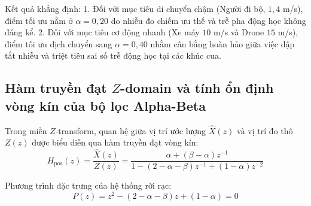 \begin{table}[H]
\centering
\caption{Độ nhạy sai số RMSE theo tham số $\alpha$ trên ba loại mục tiêu ($n=10$ seed, cự ly 400 m)}
\label{tab:multi-target-alpha-sensitivity}
\end{table}

Kết quả khẳng định:
1. Đối với mục tiêu di chuyển chậm (Người đi bộ, $1{,}4$ m/s), điểm tối ưu nằm ở $\alpha = 0{,}20$ do nhiễu đo chiếm ưu thế và trễ pha động học không đáng kể.
2. Đối với mục tiêu cơ động nhanh (Xe máy $10$ m/s và Drone $15$ m/s), điểm tối ưu dịch chuyển sang $\alpha = 0{,}40$ nhằm cân bằng hoàn hảo giữa việc dập tắt nhiễu và triệt tiêu sai số trễ động học tại các khúc cua.

\subsection{Hàm truyền đạt \texorpdfstring{$Z$}{Z}-domain và tính ổn định vòng kín của bộ lọc Alpha-Beta}

\hspace{0.5cm} Trong miền $Z$-transform, quan hệ giữa vị trí ước lượng $\hat{X}(z)$ và vị trí đo thô $Z(z)$ được biểu diễn qua hàm truyền đạt vòng kín:
\begin{equation}
H_{\text{pos}}(z) = \frac{\hat{X}(z)}{Z(z)} = \frac{\alpha + (\beta - \alpha) z^{-1}}{1 - (2 - \alpha - \beta) z^{-1} + (1 - \alpha) z^{-2}}
\label{eq:z-transform-alpha-beta-transfer}
\end{equation}

Phương trình đặc trưng của hệ thống rời rạc:
\begin{equation}
P(z) = z^2 - (2 - \alpha - \beta) z + (1 - \alpha) = 0
\label{eq:alpha-beta-characteristic-poly}
\end{equation}

